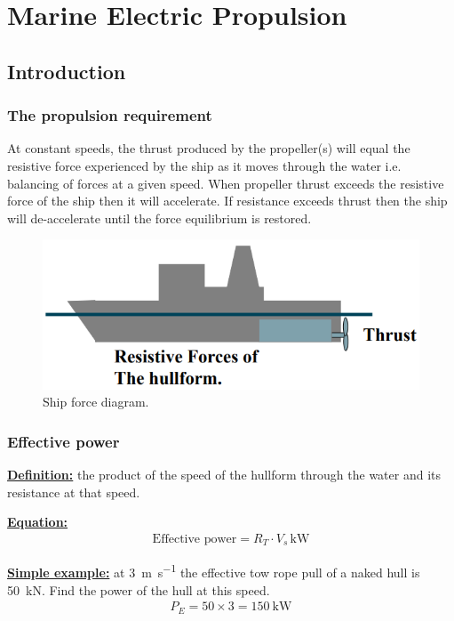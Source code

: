 \chapter{Marine Electric Propulsion}
\section{Introduction}
\subsection{The propulsion requirement}
At constant speeds, the thrust produced by the propeller(s) will equal the resistive force experienced by the ship as it moves through the water i.e. balancing of forces at a given speed. When propeller thrust exceeds the resistive force of the ship then it will accelerate. If resistance exceeds thrust then the ship will de-accelerate until the force equilibrium is restored.
\begin{figure}[H]
    \centering
    \includegraphics[width = \textwidth]{img/figure52.png}
    \caption{Ship force diagram.}
\end{figure}
\subsection{Effective power}
\textbf{\underline{Definition:}} the product of the speed of the hullform through the water and its resistance at that speed.

\textbf{\underline{Equation:}}
\begin{gather}
    \textrm{Effective power}=R_T\cdot V_s \, \si{\kilo\watt}
\end{gather}

\textbf{\underline{Simple example:}} at \SI{3}{\meter\per\second} the effective tow rope pull of a naked hull is \SI{50}{\kilo\newton}. Find the power of the hull at this speed.
\begin{gather}
    P_E = 50\times 3=\SI{150}{\kilo\watt}
\end{gather}
